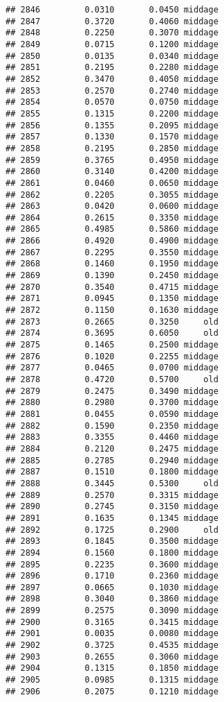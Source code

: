 \documentclass[
]{article}
\begin{document}
\begin{verbatim}
## 2846         0.0310       0.0450 middage
## 2847         0.3720       0.4060 middage
## 2848         0.2250       0.3070 middage
## 2849         0.0715       0.1200 middage
## 2850         0.0135       0.0340 middage
## 2851         0.2195       0.2280 middage
## 2852         0.3470       0.4050 middage
## 2853         0.2570       0.2740 middage
## 2854         0.0570       0.0750 middage
## 2855         0.1315       0.2200 middage
## 2856         0.1355       0.2095 middage
## 2857         0.1330       0.1570 middage
## 2858         0.2195       0.2850 middage
## 2859         0.3765       0.4950 middage
## 2860         0.3140       0.4200 middage
## 2861         0.0460       0.0650 middage
## 2862         0.2205       0.3055 middage
## 2863         0.0420       0.0600 middage
## 2864         0.2615       0.3350 middage
## 2865         0.4985       0.5860 middage
## 2866         0.4920       0.4900 middage
## 2867         0.2295       0.3550 middage
## 2868         0.1460       0.1950 middage
## 2869         0.1390       0.2450 middage
## 2870         0.3540       0.4715 middage
## 2871         0.0945       0.1350 middage
## 2872         0.1150       0.1630 middage
## 2873         0.2665       0.3250     old
## 2874         0.3695       0.6050     old
## 2875         0.1465       0.2500 middage
## 2876         0.1020       0.2255 middage
## 2877         0.0465       0.0700 middage
## 2878         0.4720       0.5700     old
## 2879         0.2475       0.3490 middage
## 2880         0.2980       0.3700 middage
## 2881         0.0455       0.0590 middage
## 2882         0.1590       0.2350 middage
## 2883         0.3355       0.4460 middage
## 2884         0.2120       0.2475 middage
## 2885         0.2785       0.2940 middage
## 2887         0.1510       0.1800 middage
## 2888         0.3445       0.5300     old
## 2889         0.2570       0.3315 middage
## 2890         0.2745       0.3150 middage
## 2891         0.1635       0.1345 middage
## 2892         0.1725       0.2900     old
## 2893         0.1845       0.3500 middage
## 2894         0.1560       0.1800 middage
## 2895         0.2235       0.3600 middage
## 2896         0.1710       0.2360 middage
## 2897         0.0665       0.1030 middage
## 2898         0.3040       0.3860 middage
## 2899         0.2575       0.3090 middage
## 2900         0.3165       0.3415 middage
## 2901         0.0035       0.0080 middage
## 2902         0.3725       0.4535 middage
## 2903         0.2655       0.3060 middage
## 2904         0.1315       0.1850 middage
## 2905         0.0985       0.1315 middage
## 2906         0.2075       0.1210 middage

\end{verbatim}
\end{document}
